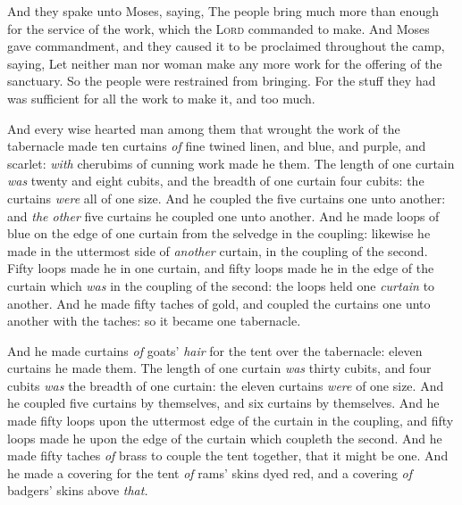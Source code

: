 \documentclass[11pt,letterpaper,oneside]{memoir}
\begin{document}
And they spake unto Moses, saying, The people bring much more than
enough for the service of the work, which the \textsc{Lord} commanded to
make. And Moses gave commandment, and they caused it to be proclaimed
throughout the camp, saying, Let neither man nor woman make any more
work for the offering of the sanctuary. So the people were restrained
from bringing. For the stuff they had was sufficient for all the work to
make it, and too much.

And every wise hearted man among them that wrought the work of the
tabernacle made ten curtains \emph{of} fine twined linen, and blue, and
purple, and scarlet: \emph{with} cherubims of cunning work made he them.
The length of one curtain \emph{was} twenty and eight cubits, and the
breadth of one curtain four cubits: the curtains \emph{were} all of one
size. And he coupled the five curtains one unto another: and \emph{the
other} five curtains he coupled one unto another. And he made loops of
blue on the edge of one curtain from the selvedge in the coupling:
likewise he made in the uttermost side of \emph{another} curtain, in the
coupling of the second. Fifty loops made he in one curtain, and fifty
loops made he in the edge of the curtain which \emph{was} in the
coupling of the second: the loops held one \emph{curtain} to another.
And he made fifty taches of gold, and coupled the curtains one unto
another with the taches: so it became one tabernacle.

And he made curtains \emph{of} goats' \emph{hair} for the tent over the
tabernacle: eleven curtains he made them. The length of one curtain
\emph{was} thirty cubits, and four cubits \emph{was} the breadth of one
curtain: the eleven curtains \emph{were} of one size. And he coupled
five curtains by themselves, and six curtains by themselves. And he made
fifty loops upon the uttermost edge of the curtain in the coupling, and
fifty loops made he upon the edge of the curtain which coupleth the
second. And he made fifty taches \emph{of} brass to couple the tent
together, that it might be one. And he made a covering for the tent
\emph{of} rams' skins dyed red, and a covering \emph{of} badgers' skins
above \emph{that.}
\end{document}
